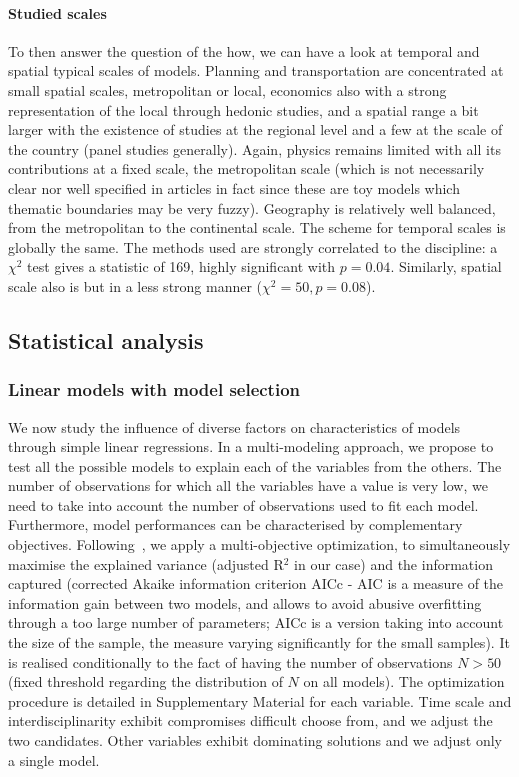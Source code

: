 \documentclass[10pt]{article}
\begin{document}
\paragraph{Studied scales}

To then answer the question of the how, we can have a look at temporal and spatial typical scales of models. Planning and transportation are concentrated at small spatial scales, metropolitan or local, economics also with a strong representation of the local through hedonic studies, and a spatial range a bit larger with the existence of studies at the regional level and a few at the scale of the country (panel studies generally). Again, physics remains limited with all its contributions at a fixed scale, the metropolitan scale (which is not necessarily clear nor well specified in articles in fact since these are toy models which thematic boundaries may be very fuzzy). Geography is relatively well balanced, from the metropolitan to the continental scale. The scheme for temporal scales is globally the same. The methods used are strongly correlated to the discipline: a $\chi^2$ test gives a statistic of 169, highly significant with $p=0.04$. Similarly, spatial scale also is but in a less strong manner ($\chi^2 = 50, p = 0.08$).


\subsection{Statistical analysis}


\subsubsection{Linear models with model selection}

We now study the influence of diverse factors on characteristics of models through simple linear regressions. In a multi-modeling approach, we propose to test all the possible models to explain each of the variables from the others. The number of observations for which all the variables have a value is very low, we need to take into account the number of observations used to fit each model. Furthermore, model performances can be characterised by complementary objectives. Following~\cite{igel2005multi}, we apply a multi-objective optimization, to simultaneously maximise the explained variance (adjusted R$^2$ in our case) and the information captured (corrected Akaike information criterion AICc - AIC is a measure of the information gain between two models, and allows to avoid abusive overfitting through a too large number of parameters; AICc is a version taking into account the size of the sample, the measure varying significantly for the small samples). It is realised conditionally to the fact of having the number of observations $N>50$ (fixed threshold regarding the distribution of $N$ on all models). The optimization procedure is detailed in Supplementary Material for each variable. Time scale and interdisciplinarity exhibit compromises difficult choose from, and we adjust the two candidates. Other variables exhibit dominating solutions and we adjust only a single model.
\end{document}

